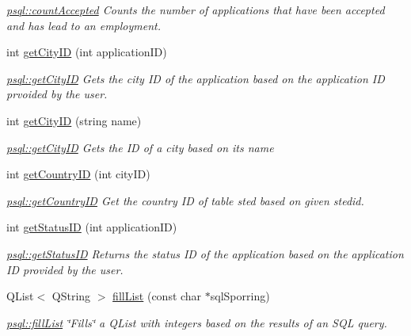 \begin{DoxyCompactItemize}
\begin{DoxyCompactList}\small\item\em \mbox{\hyperlink{classpsql_abc598b3a1783194380b9ab22d9341357}{psql\+::count\+Accepted}} Counts the number of applications that have been accepted and has lead to an employment. \end{DoxyCompactList}\item 
int \mbox{\hyperlink{classpsql_af3462a12dc106e0ca8df4fa8fcf28436}{get\+City\+ID}} (int application\+ID)
\begin{DoxyCompactList}\small\item\em \mbox{\hyperlink{classpsql_af3462a12dc106e0ca8df4fa8fcf28436}{psql\+::get\+City\+ID}} Gets the city ID of the application based on the application ID prvoided by the user. \end{DoxyCompactList}\item 
int \mbox{\hyperlink{classpsql_a0c33b3f48064ba75abaa4b0b58eb1ccd}{get\+City\+ID}} (string name)
\begin{DoxyCompactList}\small\item\em \mbox{\hyperlink{classpsql_af3462a12dc106e0ca8df4fa8fcf28436}{psql\+::get\+City\+ID}} Gets the ID of a city based on its name \end{DoxyCompactList}\item 
int \mbox{\hyperlink{classpsql_a81d02dc0350ba11d90257914078ba432}{get\+Country\+ID}} (int city\+ID)
\begin{DoxyCompactList}\small\item\em \mbox{\hyperlink{classpsql_a81d02dc0350ba11d90257914078ba432}{psql\+::get\+Country\+ID}} Get the country ID of table sted based on given stedid. \end{DoxyCompactList}\item 
int \mbox{\hyperlink{classpsql_a9c02c92c09cb60c35d24375673b7df06}{get\+Status\+ID}} (int application\+ID)
\begin{DoxyCompactList}\small\item\em \mbox{\hyperlink{classpsql_a9c02c92c09cb60c35d24375673b7df06}{psql\+::get\+Status\+ID}} Returns the status ID of the application based on the application ID provided by the user. \end{DoxyCompactList}\item 
Q\+List$<$ Q\+String $>$ \mbox{\hyperlink{classpsql_a2ad41caea89dc5af0b55b12f6394fbf5}{fill\+List}} (const char $\ast$sql\+Sporring)
\begin{DoxyCompactList}\small\item\em \mbox{\hyperlink{classpsql_a2ad41caea89dc5af0b55b12f6394fbf5}{psql\+::fill\+List}} \char`\"{}\+Fills\char`\"{} a Q\+List with integers based on the results of an S\+QL query. \end{DoxyCompactList}\item 

\end{DoxyCompactItemize}
